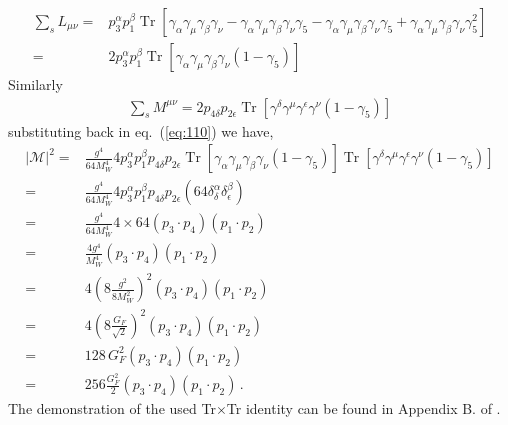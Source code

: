 \begin{align}
  \sum_s L_{\mu\nu}=&p_3^\alpha p_1^\beta\operatorname{Tr}\left[\gamma_\alpha\gamma_\mu\gamma_\beta\gamma_\nu-\gamma_\alpha\gamma_\mu\gamma_\beta\gamma_\nu\gamma_5-\gamma_\alpha\gamma_\mu\gamma_\beta\gamma_\nu\gamma_5
+\gamma_\alpha\gamma_\mu\gamma_\beta\gamma_\nu\gamma_5^2\right]\nonumber\\
=&2 p_3^\alpha p_1^\beta\operatorname{Tr}\left[\gamma_\alpha\gamma_\mu\gamma_\beta\gamma_\nu(1-\gamma_5)\right]
\end{align}
Similarly
\begin{align}
  \sum_s M^{\mu\nu}=2 p_{4\delta}p_{2\epsilon}\operatorname{Tr}\left[\gamma^\delta\gamma^\mu\gamma^\epsilon\gamma^\nu(1-\gamma_5)\right]
\end{align}
substituting back in eq.~(\ref{eq:110}) we have,
\begin{align}
  \label{eq:112}
   |\mathcal{M}|^2=&\frac{g^4}{64 M_W^4}4p_3^\alpha p_1^\beta p_{4\delta}p_{2\epsilon}
   \operatorname{Tr}\left[\gamma_\alpha\gamma_\mu\gamma_\beta\gamma_\nu(1-\gamma_5)\right]
   \operatorname{Tr}\left[\gamma^\delta\gamma^\mu\gamma^\epsilon\gamma^\nu(1-\gamma_5)\right]\nonumber\\
   =&\frac{g^4}{64 M_W^4}4p_3^\alpha p_1^\beta p_{4\delta}p_{2\epsilon}(64\delta^\alpha_\delta\delta^\beta_\epsilon)\nonumber\\
  =&\frac{g^4}{64 M_W^4}4\times64(p_3\cdot p_4)(p_1\cdot p_2)\nonumber\\
  =&\frac{4g^4}{M_W^4}(p_3\cdot p_4)(p_1\cdot p_2)\nonumber\\
  =&4\left(8\frac{g^2}{8M_W^2}\right)^2(p_3\cdot p_4)(p_1\cdot p_2)\nonumber\\
  =&4\left(8\frac{G_F}{\sqrt{2}}\right)^2(p_3\cdot p_4)(p_1\cdot p_2)\nonumber\\
  =&128\, G_F^2(p_3\cdot p_4)(p_1\cdot p_2)\nonumber\\
  =&256\frac{G_F^2}{{2}}(p_3\cdot p_4)(p_1\cdot p_2)\,.
\end{align}
The demonstration of the used Tr$\times$Tr identity can be found in Appendix B. of \cite{PeterRenton}.

